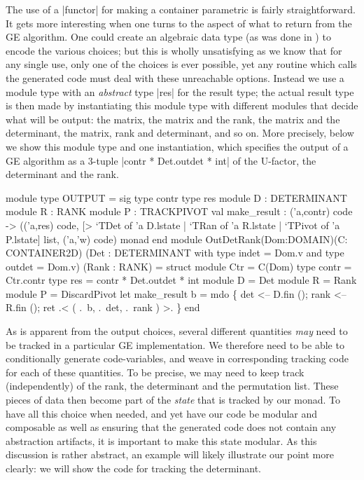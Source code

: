 \documentclass{llncs}
\begin{document}
The use of a |functor| for making a container parametric is fairly 
straightforward.  It gets more interesting when one turns to the aspect
of what to return from the GE algorithm.  One could create an algebraic
data type (as was done in \cite{carette04}) to encode the various
choices; but this is wholly unsatisfying as we know that for any single
use, only one of the choices is ever possible, yet any routine which
calls the generated code must deal with these unreachable options.
Instead we use a module type with an \emph{abstract} type |res| for the
result type; the actual result type is then made by instantiating
this module type with different modules that decide what will be 
output: the matrix, the matrix and the rank, the matrix and the
determinant, the matrix, rank and determinant, and so on.  More
precisely, below we show this module type and one instantiation,
which specifies the output of a  GE algorithm as a 3-tuple
|contr * Det.outdet * int| of the U-factor, the determinant and the rank.

\begin{code}
module type OUTPUT = sig
  type contr  type res
  module D : DETERMINANT   module R : RANK
  module P : TRACKPIVOT
  val make_result : ('a,contr) code -> 
    (('a,res) code,
     [> `TDet of 'a D.lstate | `TRan of 'a R.lstate | `TPivot of 'a P.lstate]
       list, ('a,'w) code) monad
end
module OutDetRank(Dom:DOMAIN)(C: CONTAINER2D)
    (Det : DETERMINANT with type indet = Dom.v and type outdet = Dom.v)
    (Rank : RANK) = struct
  module Ctr = C(Dom)
  type contr = Ctr.contr
  type res = contr * Det.outdet * int
  module D = Det   module R = Rank
  module P = DiscardPivot
  let make_result b = mdo \{ det  <-- D.fin ();  rank <-- R.fin ();
    ret .< ( .~b, .~det, .~rank ) >. \}
end
\end{code}

As is apparent from the output choices, several different quantities
\emph{may} need to be tracked in a particular GE implementation.
We therefore need to be able to conditionally generate code-variables,
and weave in corresponding tracking code for each of these quantities.
To be precise, we may need to keep track (independently) of the rank,
the determinant and the permutation list.  These pieces of data then
become part of the \emph{state} that is tracked by our monad.  To have
all this choice when needed, and yet have our code be modular and
composable as well as ensuring that the generated code does not 
contain any abstraction artifacts, it is important to make this 
state modular.  As this discussion is rather abstract, an example
will likely illustrate our point more clearly: we will show the 
code for tracking the determinant.
\end{document}
